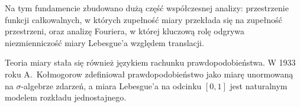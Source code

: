 Na tym fundamencie zbudowano dużą część współczesnej analizy: przestrzenie funkcji całkowalnych, w których zupełność miary przekłada się na zupełność przestrzeni, oraz analizę Fouriera, w której kluczową rolę odgrywa niezmienniczość miary Lebesgue'a względem translacji.

Teoria miary stała się również językiem rachunku prawdopodobieństwa. W 1933 roku A.~Kołmogorow zdefiniował prawdopodobieństwo jako miarę unormowaną na $\sigma$-algebrze zdarzeń, a miara Lebesgue'a na odcinku $[0,1]$ jest naturalnym modelem rozkładu jednostajnego.

